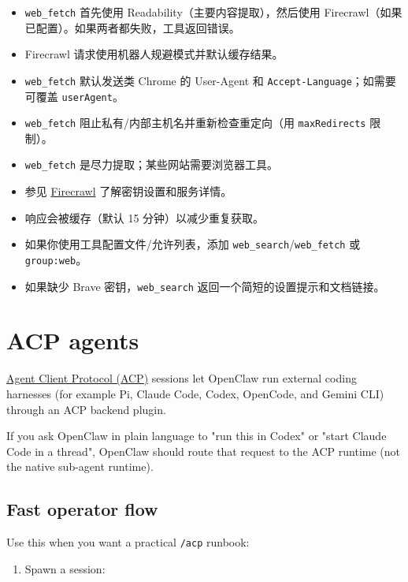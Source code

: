 \begin{itemize}
  \item \texttt{web\_fetch} 首先使用 Readability（主要内容提取），然后使用 Firecrawl（如果已配置）。如果两者都失败，工具返回错误。
  \item Firecrawl 请求使用机器人规避模式并默认缓存结果。
  \item \texttt{web\_fetch} 默认发送类 Chrome 的 User-Agent 和 \texttt{Accept-Language}；如需要可覆盖 \texttt{userAgent}。
  \item \texttt{web\_fetch} 阻止私有/内部主机名并重新检查重定向（用 \texttt{maxRedirects} 限制）。
  \item \texttt{web\_fetch} 是尽力提取；某些网站需要浏览器工具。
  \item 参见 \href{/tools/firecrawl}{Firecrawl} 了解密钥设置和服务详情。
  \item 响应会被缓存（默认 15 分钟）以减少重复获取。
  \item 如果你使用工具配置文件/允许列表，添加 \texttt{web\_search}/\texttt{web\_fetch} 或 \texttt{group:web}。
  \item 如果缺少 Brave 密钥，\texttt{web\_search} 返回一个简短的设置提示和文档链接。
\end{itemize}



\clearpage
\section{ACP agents}


\href{https://agentclientprotocol.com/}{Agent Client Protocol (ACP)} sessions let OpenClaw run external coding harnesses (for example Pi, Claude Code, Codex, OpenCode, and Gemini CLI) through an ACP backend plugin.

If you ask OpenClaw in plain language to "run this in Codex" or "start Claude Code in a thread", OpenClaw should route that request to the ACP runtime (not the native sub-agent runtime).

\subsection{Fast operator flow}


Use this when you want a practical \texttt{/acp} runbook:

\begin{enumerate}
  \item Spawn a session:
\end{enumerate}

